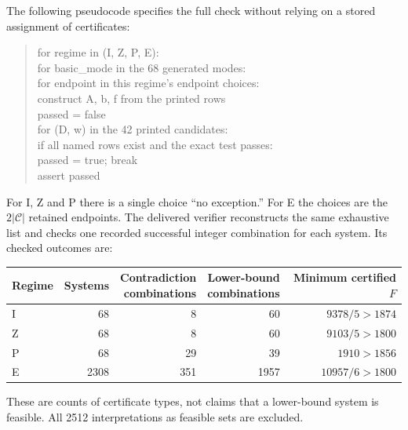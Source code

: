 \documentclass[11pt,a4paper]{article}
\theoremstyle{remark}
\begin{document}
The following pseudocode specifies the full check without relying on a
stored assignment of certificates:
\begin{quote}\small\ttfamily
for regime in (I, Z, P, E):\\
\hspace*{1em}for basic\_mode in the 68 generated modes:\\
\hspace*{2em}for endpoint in this regime's endpoint choices:\\
\hspace*{3em}construct A, b, f from the printed rows\\
\hspace*{3em}passed = false\\
\hspace*{3em}for (D, w) in the 42 printed candidates:\\
\hspace*{4em}if all named rows exist and the exact test passes:\\
\hspace*{5em}passed = true; break\\
\hspace*{3em}assert passed
\end{quote}
For I, Z and P there is a single choice ``no exception.'' For E the
choices are the $2|\mathcal C|$ retained endpoints. The delivered verifier
reconstructs the same exhaustive list and checks one recorded successful
integer combination for each system. Its checked outcomes are:
\begin{center}\small
\begin{tabular}{lrrrr}
\toprule
Regime&Systems&\shortstack{Contradiction\\combinations}&\shortstack{Lower-bound\\combinations}&\shortstack{Minimum\\certified $F$}\\
\midrule
I&68&8&60&$9378/5>1874$\\
Z&68&8&60&$9103/5>1800$\\
P&68&29&39&$1910>1856$\\
E&2308&351&1957&$10957/6>1800$\\
\bottomrule
\end{tabular}
\end{center}
These are counts of certificate types, not claims that a lower-bound
system is feasible. All 2512 interpretations as feasible sets are excluded.
\end{document}
